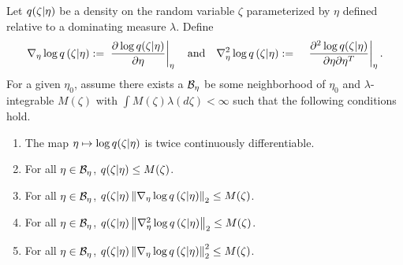 

\begin{assu}
%
Let $q(\zeta \vert \eta)$ be a density on the random variable $\zeta$
parameterized by $\eta$ defined relative to a dominating measure $\lambda$.
%
Define
%
\begin{align*}
%
\lqgrad{\zeta \vert \eta} :={}&
    \fracat{\partial \log \q(\zeta \vert \eta)}{\partial \eta}{\eta}
    \mathtxt{and}
%
\lqhess{\zeta \vert \eta} :={}&
    \fracat{\partial^2 \log \q(\zeta \vert \eta)}
           {\partial \eta \partial \eta^T}{\eta}.
%
\end{align*}
%
For a given $\eta_0$, assume there exists a $\mathcal{B}_\eta$ be some neighborhood of
$\eta_0$ and $\lambda$-integrable $M(\zeta)$ with $\int M(\zeta) \lambda(d\zeta) <
\infty$ such that the following conditions hold.
%
\begin{enumerate}
%
\item  {} The map $\eta \mapsto \log q(\zeta \vert \eta)$
is twice continuously differentiable.
%
\item {} For all $\eta \in \mathcal{B}_\eta$, $q(\zeta \vert \eta) \le
M(\zeta)$.
%
\item {} For all $\eta \in \mathcal{B}_\eta$, $q(\zeta \vert \eta)
\left\Vert{\nabla_\eta \log q}\left(\zeta \vert \eta\right)\right\Vert_2 \le M(\zeta)$.
%
\item {} For all $\eta \in \mathcal{B}_\eta$, $q(\zeta \vert \eta)
\left\Vert{\nabla_\eta^2 \log q}\left(\zeta \vert \eta\right)\right\Vert_2 \le M(\zeta)$.
%
\item {} For all $\eta \in \mathcal{B}_\eta$, $q(\zeta \vert \eta)
\left\Vert{\nabla_\eta \log q}\left(\zeta \vert \eta\right)\right\Vert_2^2 \le M(\zeta)$.
%
\end{enumerate}
%
\end{assu}

